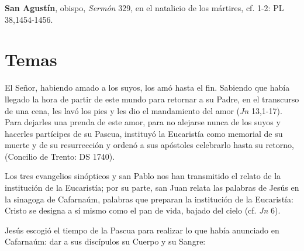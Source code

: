 \begin{patercite}
\textbf{San Agustín}, obispo, \textit{Sermón} 329, en el natalicio de los mártires, cf. 1-2: PL 38,1454-1456.
	
\end{patercite}

\newsection 
\section{Temas}


\begin{ccebody}


 El Señor, habiendo amado a los suyos, los amó hasta el fin. Sabiendo que había llegado la hora de partir de este mundo para retornar a su Padre, en el transcurso de una cena, les lavó los pies y les dio el mandamiento del amor (\textit{Jn} 13,1-17). Para dejarles una prenda de este amor, para no alejarse nunca de los suyos y hacerles partícipes de su Pascua, instituyó la Eucaristía como memorial de su muerte y de su resurrección y ordenó a sus apóstoles celebrarlo hasta su retorno,  (Concilio de Trento: DS 1740).

 Los tres evangelios sinópticos y san Pablo nos han transmitido el relato de la institución de la Eucaristía; por su parte, san Juan relata las palabras de Jesús en la sinagoga de Cafarnaúm, palabras que preparan la institución de la Eucaristía: Cristo se designa a sí mismo como el pan de vida, bajado del cielo (cf. \textit{Jn} 6).

 Jesús escogió el tiempo de la Pascua para realizar lo que había anunciado en Cafarnaúm: dar a sus discípulos su Cuerpo y su Sangre:



\end{ccebody}
